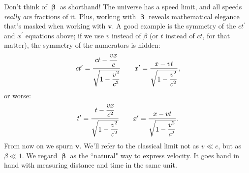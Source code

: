 \documentclass[12pt]{article}
\renewcommand{\vv}[1]{\mathbf{#1}}
\newcommand{\vvbeta}{\bm{\upbeta}}
\begin{document}
Don't think of $\vvbeta$ as shorthand! The universe has a speed limit, and all speeds \emph{really are} fractions of it. Plus, working with $\vvbeta$ reveals mathematical elegance that's masked when working with $\vv v$. A good example is the symmetry of the $ct^\prime$ and $x^\prime$ equations above; if we use $v$ instead of $\beta$ (or $t$ instead of $ct$, for that matter), the symmetry of the numerators is hidden:
\begin{equation*}
ct^\prime = \frac{ct - \dfrac{vx}{\vphantom{V_v} c}}{\sqrt{1 - \dfrac{v^2}{c^2}}} \qquad x^\prime = \frac{x - vt}{\sqrt{1 - \dfrac{v^2}{c^2}}},
\end{equation*}
or worse:
\begin{equation*}
t^\prime = \frac{t - \dfrac{vx}{\vphantom{V_v} c^2}}{\sqrt{1 - \dfrac{v^2}{c^2}}} \qquad x^\prime = \frac{x - vt}{\sqrt{1 - \dfrac{v^2}{c^2}}}.
\end{equation*}
From now on we spurn $\vv v$. We'll refer to the classical limit not as $v \ll c$, but as $\beta \ll 1$. We regard $\vvbeta$ as the ``natural" way to express velocity. It goes hand in hand with measuring distance and time in the same unit.
 
\end{document}
